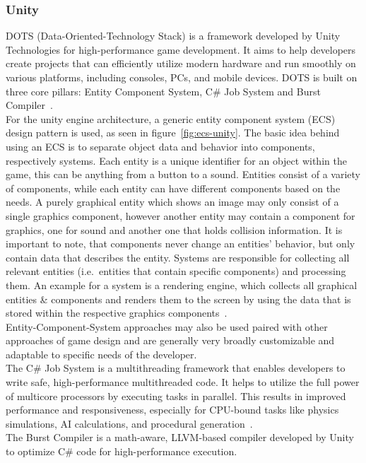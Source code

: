 \subsubsection{Unity}\label{subsubsec:entity-component-system}
DOTS (Data-Oriented-Technology Stack) is a framework developed by Unity Technologies for high-performance game development.
It aims to help developers create projects that can efficiently utilize modern hardware and run smoothly on various platforms,
including consoles, PCs, and mobile devices.
DOTS is built on three core pillars: Entity Component System, C\# Job System and Burst Compiler~\cite{dots}.
\\
For the unity engine architecture, a generic entity component system (\gls{ECS}) design pattern is used, as seen in figure~\ref{fig:ecs-unity}.
The basic idea behind using an \gls{ECS} is to separate object data and behavior into components, respectively systems.
Each entity is a unique identifier for an object within the game, this can be anything from a button to a sound.
Entities consist of a variety of components, while each entity can have different components based on the needs.
A purely graphical entity which shows an image may only consist of a single graphics component, however another entity may contain
a component for graphics, one for sound and another one that holds collision information.
It is important to note, that components never change an entities' behavior, but only contain data that describes the entity.
Systems are responsible for collecting all relevant entities (i.e.\ entities that contain specific components) and processing them.
An example for a system is a rendering engine, which collects all graphical entities \& components and renders them to the screen by
using the data that is stored within the respective graphics components~\cite{dots}.
\\
Entity-Component-System approaches may also be used paired with other approaches of game design and are generally very broadly customizable and adaptable
to specific needs of the developer.
\\
The C\# Job System is a multithreading framework that enables developers to write safe, high-performance multithreaded code.
It helps to utilize the full power of multicore processors by executing tasks in parallel.
This results in improved performance and responsiveness, especially for CPU-bound tasks like physics simulations, AI calculations, and procedural generation~\cite{dots}.
\\
The Burst Compiler is a math-aware, LLVM-based compiler developed by Unity to optimize C\# code for high-performance execution.
